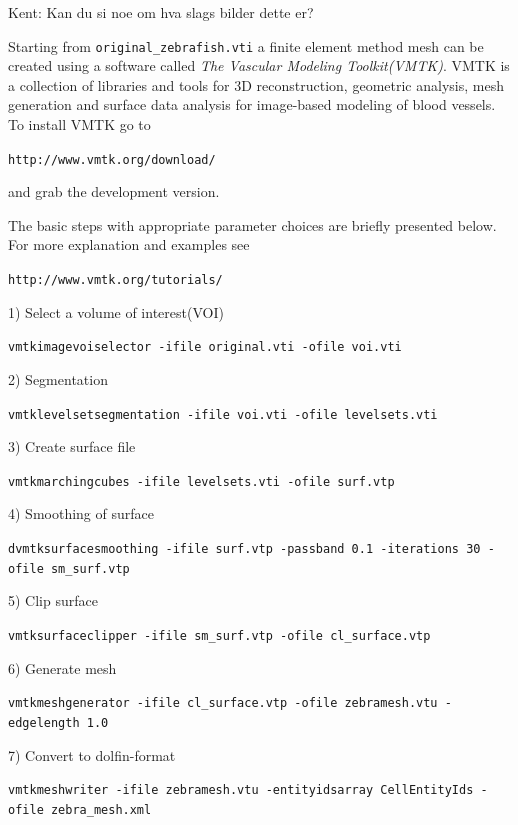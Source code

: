 \documentclass[epsfig,11pt]{article}
\begin{document}
{\color{red} Kent: Kan du si noe om hva slags bilder dette er?}

Starting from \texttt{original\_zebrafish.vti} a finite element method mesh can be created using a software called \emph{The Vascular Modeling Toolkit(VMTK)}. VMTK is a collection of libraries and tools for 3D reconstruction, geometric analysis, mesh generation and surface data analysis for image-based modeling of blood vessels. To install VMTK go to 

\texttt{http://www.vmtk.org/download/}

and grab the development version.

The basic steps with appropriate parameter choices are briefly presented below. For more explanation and examples see

\texttt{http://www.vmtk.org/tutorials/}

1) Select a volume of interest(VOI)
\begin{framed}       
    \texttt{vmtkimagevoiselector -ifile original.vti -ofile voi.vti}
\end{framed}
2) Segmentation
\begin{framed}       
    \texttt{vmtklevelsetsegmentation -ifile voi.vti -ofile levelsets.vti}
\end{framed}
3) Create surface file
\begin{framed}       
    \texttt{vmtkmarchingcubes -ifile levelsets.vti -ofile surf.vtp}
\end{framed}
4) Smoothing of surface
\begin{framed}       
    \texttt{dvmtksurfacesmoothing -ifile surf.vtp -passband 0.1 -iterations 30 -ofile sm\_surf.vtp}
\end{framed}
5) Clip surface
\begin{framed}       
    \texttt{vmtksurfaceclipper -ifile sm\_surf.vtp -ofile cl\_surface.vtp}
\end{framed}
6) Generate mesh
\begin{framed}       
    \texttt{vmtkmeshgenerator -ifile cl\_surface.vtp -ofile zebramesh.vtu -edgelength
1.0}
\end{framed}
7) Convert to dolfin-format
\begin{framed}       
    \texttt{vmtkmeshwriter -ifile zebramesh.vtu -entityidsarray CellEntityIds -ofile zebra\_mesh.xml}
\end{framed}
\end{document}
